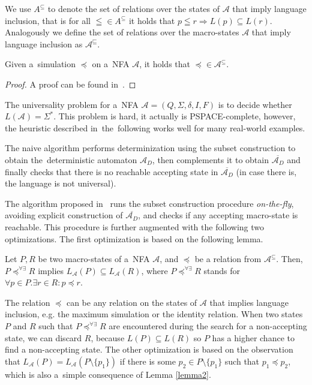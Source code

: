  We use $A^{\subseteq}$ to denote the set of relations over the states of
$\mathcal{A}$ that imply language inclusion, that is for all $\leqq \in
A^{\subseteq}$ it holds that $p \leqq r \Rightarrow L(p) \subseteq L(r)$.
Analogously we define the set of relations over the macro-states $\mathcal{A}$
that imply language inclusion as $\mathcal{A}^\sqsubseteq$.

\begin{lemma}
Given a~simulation $\preceq$ on a~NFA $\mathcal{A}$, it holds that $\preceq \in
\mathcal{A}^\subseteq$.
\end{lemma}

\begin{proof}
A proof can be found in~\cite{tacas}.
\end{proof}

The universality problem for a~NFA $\mathcal{A} = (Q, \Sigma, \delta, I, F)$ is
to decide whether $L(\mathcal{A}) = \Sigma^*$. This problem is hard, it actually
is PSPACE-complete, however, the heuristic described in~the~following works
well for many real-world examples.

The naive algorithm performs determinization using the subset construction to
obtain the~deterministic automaton $\mathcal{A}_D$, then complements it to
obtain $\overline{\mathcal{A}_D}$ and finally checks that there is no reachable
accepting state in $\overline{\mathcal{A}_D}$ (in case there is, the language
is not universal).

The algorithm proposed in~\cite{tacas} runs the subset construction procedure
\emph{on-the-fly}, avoiding explicit construction of $\overline{\mathcal{A}_D}$,
and checks if any accepting macro-state is reachable. This procedure is
further augmented with the following two optimizations.
\newpage
The first optimization is based on the following lemma.

\begin{lemma}\label{lemma2}
 Let $P, R$ be two macro-states of a~NFA $\mathcal{A}$, and $\preceq$ be a
 relation from $\mathcal{A}^\subseteq$. Then, $P \preceq^{\forall\exists} R$
 implies $L_\mathcal{A}(P) \subseteq L_\mathcal{A}(R)$, where $P
 \preceq^{\forall\exists} R$ stands for $\forall p \in P. \exists r\in R : p
 \preceq r$.
\end{lemma}

The relation $\preceq$ can be any relation on the states of $\mathcal{A}$ that
implies language inclusion, e.g. the maximum simulation or the identity
relation. When two states $P$ and $R$ such that $P \preceq^{\forall\exists}
R$ are encountered during the search for a non-accepting state, we can
discard $R$, because $L(P) \subseteq L(R)$ so $P$ has a higher chance to find
a non-accepting state. The other optimization is based on the observation that
$L_\mathcal{A}(P) = L_\mathcal{A}(P \setminus \{p_1\})$ if there is some $p_2 \in P \setminus \{p_1\}$ such that $p_1 \preceq p_2$, which is also a~simple consequence of Lemma \ref{lemma2}.

